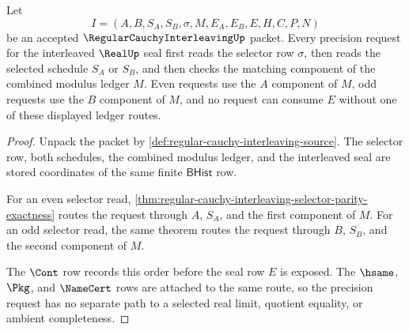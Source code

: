 \begin{theorem}
\label{thm:regular-cauchy-interleaving-combined-modulus-exactness}
Let
$$
I=(A,B,S_A,S_B,\sigma,M,E_A,E_B,E,H,C,P,N)
$$
be an accepted $\RegularCauchyInterleavingUp$ packet. Every precision request for the interleaved $\RealUp$ seal first reads the selector row $\sigma$, then reads the selected schedule $S_A$ or $S_B$, and then checks the matching component of the combined modulus ledger $M$. Even requests use the $A$ component of $M$, odd requests use the $B$ component of $M$, and no request can consume $E$ without one of these displayed ledger routes.
\end{theorem}
\begin{proof}
Unpack the packet by \autoref{def:regular-cauchy-interleaving-source}. The selector row, both schedules, the combined modulus ledger, and the interleaved seal are stored coordinates of the same finite $\mathsf{BHist}$ row.

For an even selector read, \autoref{thm:regular-cauchy-interleaving-selector-parity-exactness} routes the request through $A$, $S_A$, and the first component of $M$. For an odd selector read, the same theorem routes the request through $B$, $S_B$, and the second component of $M$.

The $\Cont$ row records this order before the seal row $E$ is exposed. The $\hsame$, $\Pkg$, and $\NameCert$ rows are attached to the same route, so the precision request has no separate path to a selected real limit, quotient equality, or ambient completeness.
\end{proof}

